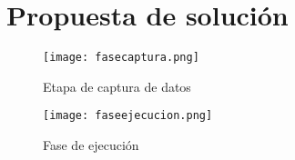 \section{Propuesta de solución}

\begin{figure}[htb]
	\centering
	\texttt{[image: fasecaptura.png]}
	\caption{Etapa de captura de datos}
\end{figure}

\begin{figure}[htb]
	\centering
	\texttt{[image: faseejecucion.png]}
	\caption{Fase de ejecución}
\end{figure}